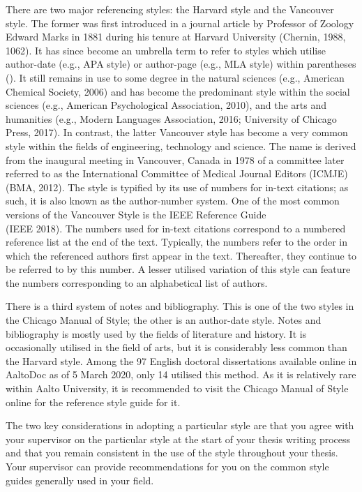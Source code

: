 \documentclass[english, 12pt, a4paper, elec, utf8, a-2b, online]{aaltothesis}
\begin{document}
There are two major referencing styles: the Harvard style and the Vancouver 
style. The former was first introduced in a journal article by Professor of 
Zoology Edward Marks in 1881 during his tenure at Harvard University (Chernin, 
1988, 1062). It has since become an umbrella term to refer to styles which 
utilise author-date (e.g., APA style) or author-page (e.g., MLA style) within 
parentheses (). It still remains in use to some degree in the natural sciences 
(e.g., American Chemical Society, 2006) and has become the predominant style 
within the social sciences (e.g., American Psychological Association, 2010), and
the arts and humanities (e.g., Modern Languages Association, 2016; University of
Chicago Press, 2017). In contrast, the latter Vancouver style has become a very 
common style within the fields of engineering, technology and science. The name 
is derived from the inaugural meeting in Vancouver, Canada in 1978 of a 
committee later referred to as the International Committee of Medical Journal 
Editors (ICMJE) (BMA, 2012). The style is typified by its use of numbers for 
in-text citations; as such, it is also known as the author-number system. One of
the most common versions of the Vancouver Style is the IEEE Reference Guide \\
(IEEE 2018). The numbers used for in-text citations correspond to a numbered 
reference list at the end of the text. Typically, the numbers refer to the order
in which the referenced authors first appear in the text. Thereafter, they 
continue to be referred to by this number. A lesser utilised variation of this 
style can feature the numbers corresponding to an alphabetical list of authors.

There is a third system of notes and bibliography. This is one of the two styles
in the Chicago Manual of Style; the other is an author-date style. Notes and 
bibliography is mostly used by the fields of literature and history. It is 
occasionally utilised in the field of arts, but it is considerably less common 
than the Harvard style. Among the 97 English doctoral dissertations available 
online in AaltoDoc as of 5 March 2020, only 14 utilised this method. As it is 
relatively rare within Aalto University, it is recommended to visit the Chicago 
Manual of Style online for the reference style guide for it.

The two key considerations in adopting a particular style are that you agree 
with your supervisor on the particular style at the start of your thesis writing
process and that you remain consistent in the use of the style throughout your 
thesis. Your supervisor can provide recommendations for you on the common style 
guides generally used in your field.
\end{document}
